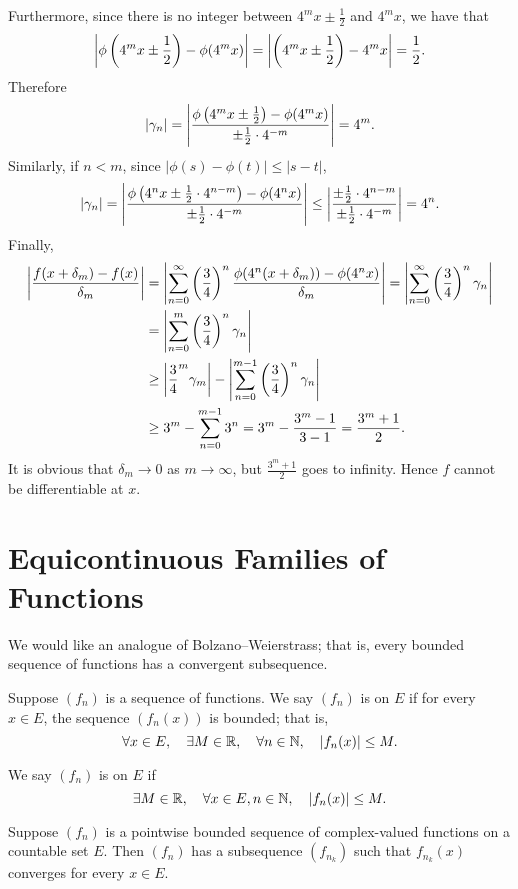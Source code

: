 \begin{example}
\begin{itemize}
Furthermore, since there is no integer between $4^m x\pm\frac{1}{2}$ and $4^m x$, we have that
\[\left|\phi\left(4^m x\pm\frac{1}{2}\right)-\phi(4^m x)\right|=\left|\left(4^m x\pm\frac{1}{2}\right)-4^m x\right|=\frac{1}{2}.\]
Therefore
\[|\gamma_n|=\left|\frac{\phi\left(4^m x\pm\frac{1}{2}\right)-\phi(4^m x)}{\pm\frac{1}{2}\cdot4^{-m}}\right|=4^m.\]
Similarly, if $n<m$, since $|\phi(s)-\phi(t)|\le|s-t|$,
\[|\gamma_n|=\left|\frac{\phi\left(4^n x\pm\frac{1}{2}\cdot4^{n-m}\right)-\phi(4^n x)}{\pm\frac{1}{2}\cdot4^{-m}}\right|\le\left|\frac{\pm\frac{1}{2}\cdot4^{n-m}}{\pm\frac{1}{2}\cdot4^{-m}}\right|=4^n.\]
Finally,
\begin{align*}
\left|\frac{f(x+\delta_m)-f(x)}{\delta_m}\right|
&=\left|\sum_{n=0}^{\infty}\left(\frac{3}{4}\right)^n\frac{\phi(4^n(x+\delta_m))-\phi(4^n x)}{\delta_m}\right|=\left|\sum_{n=0}^{\infty}\left(\frac{3}{4}\right)^n\gamma_n\right|\\
&=\left|\sum_{n=0}^{m}\left(\frac{3}{4}\right)^n\gamma_n\right|\\
&\ge\left|\frac{3}{4}^m\gamma_m\right|-\left|\sum_{n=0}^{m-1}\left(\frac{3}{4}\right)^n\gamma_n\right|\\
&\ge3^m-\sum_{n=0}^{m-1}3^n=3^m-\frac{3^m-1}{3-1}=\frac{3^m+1}{2}.
\end{align*}
It is obvious that $\delta_m\to0$ as $m\to\infty$, but $\frac{3^m+1}{2}$ goes to infinity. Hence $f$ cannot be differentiable at $x$.
\end{itemize}
\end{example}
\pagebreak

\section{Equicontinuous Families of Functions}
We would like an analogue of Bolzano--Weierstrass; that is, every bounded sequence of functions has a convergent subsequence.

\begin{definition}
Suppose $(f_n)$ is a sequence of functions. We say $(f_n)$ is  on $E$ if for every $x\in E$, the sequence $(f_n(x))$ is bounded; that is,
\[\forall x\in E,\quad\exists M\in\mathbb R,\quad\forall n\in\mathbb N,\quad |f_n(x)|\le M.\]

We say $(f_n)$ is  on $E$ if
\[\exists M\in\mathbb R,\quad\forall x\in E,n\in\mathbb N,\quad |f_n(x)|\le M.\]
\end{definition}

\begin{lemma}
Suppose $(f_n)$ is a pointwise bounded sequence of complex-valued functions on a countable set $E$. Then $(f_n)$ has a subsequence $(f_{n_k})$ such that $f_{n_k}(x)$ converges for every $x\in E$.
\end{lemma}


